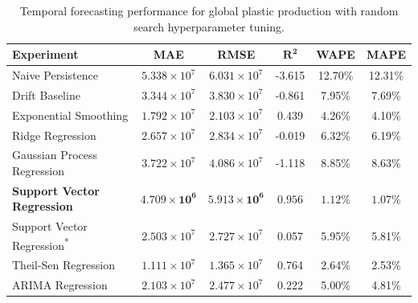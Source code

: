 \begin{table}[!ht]
	\centering
	\caption{\centering Temporal forecasting performance for global plastic production with random search hyperparameter tuning.}
	\begin{tabular}{@{}lccccc@{}}
		\toprule
		\textbf{Experiment}                          & \textbf{MAE}                   & \textbf{RMSE}                  & $\mathbf{R^2}$     & \textbf{WAPE}       & \textbf{MAPE}       \\
		\midrule
		Naive Persistence                            & \(5.338 \times 10^7\)          & \(6.031 \times 10^7\)          & -3.615             & 12.70\%             & 12.31\%             \\
		Drift Baseline                               & \(3.344 \times 10^7\)          & \(3.830 \times 10^7\)          & -0.861             & 7.95\%              & 7.69\%              \\
		Exponential Smoothing                        & \(1.792 \times 10^7\)          & \(2.103 \times 10^7\)          & 0.439              & 4.26\%              & 4.10\%              \\
		Ridge Regression                             & \(2.657 \times 10^7\)          & \(2.834 \times 10^7\)          & -0.019             & 6.32\%              & 6.19\%              \\
		Gaussian Process Regression                  & \(3.722 \times 10^7\)          & \(4.086 \times 10^7\)          & -1.118             & 8.85\%              & 8.63\%              \\
		\textbf{Support Vector Regression}           & \(\mathbf{4.709 \times 10^6}\) & \(\mathbf{5.913 \times 10^6}\) & \(\mathbf{0.956}\) & \(\mathbf{1.12}\)\% & \(\mathbf{1.07}\)\% \\
		Support Vector Regression\textsuperscript{*} & \(2.503 \times 10^7\)          & \(2.727 \times 10^7\)          & 0.057              & 5.95\%              & 5.81\%              \\
		Theil-Sen Regression                         & \(1.111 \times 10^7\)          & \(1.365 \times 10^7\)          & 0.764              & 2.64\%              & 2.53\%              \\
		ARIMA Regression                             & \(2.103 \times 10^7\)          & \(2.477 \times 10^7\)          & 0.222              & 5.00\%              & 4.81\%              \\
		\hline
	\end{tabular}
	\label{tab:global_forecasting_random_search_metric_table}
\end{table}


